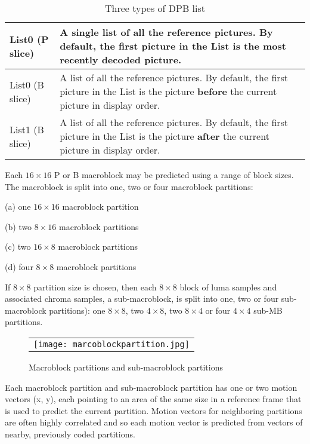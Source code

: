 \documentclass[../main.tex]{subfiles}
\begin{document}
\begin{table}[ht]
\label{tab:list}
\begin{center}       
\begin{tabular}{|l|l|} 
\hline
\rule[-1ex]{0pt}{3.5ex}  List0 (P slice) & A single list of all the reference pictures.  By default, the first picture in
the List is the most recently decoded picture.\\  %
\hline
\rule[-1ex]{0pt}{3.5ex}  List0 (B slice) & A list of all the reference pictures. By default, the first picture in the List
is the picture \textbf {before} the current picture in display order.   \\%
\hline
\rule[-1ex]{0pt}{3.5ex}  List1 (B slice) & A list of all the reference pictures. By default, the first picture in the List
is the picture \textbf {after} the current picture in display order.  \\%
\hline

\end{tabular}
\end{center}
\caption{Three types of DPB list} 
\end{table}

Each $16 \times 16$ P or B macroblock may be predicted using a range
of block sizes. The macroblock is split into one, two or four
macroblock partitions:

(a) one $16 \times 16$ macroblock partition 

(b) two $8 \times 16$ macroblock partitions

(c) two $16 \times 8$ macroblock partitions 

(d) four $8 \times 8$ macroblock partitions

If $8 \times 8$ partition size is chosen, then each $8 \times 8$ block of luma samples and associated chroma
samples, a sub-macroblock, is split into one, two or four sub-macroblock partitions): one
$8 \times 8$, two $4 \times 8$, two $8 \times 4$ or four $4 \times 4$ sub-MB partitions.

\begin{figure} [ht]
   \begin{center}
   \begin{tabular}{c} %
   \texttt{[image: marcoblockpartition.jpg]}
   \end{tabular}
   \end{center}
   \caption[example] 
   { \label{fig:example1} 
Macroblock partitions and sub-macroblock partitions}
   \end{figure}     %
   
Each macroblock partition and sub-macroblock partition has one or two motion vectors
(x, y), each pointing to an area of the same size in a reference frame that is used to predict the
current partition. Motion vectors for neighboring partitions are often highly
correlated and so each motion vector is predicted from vectors of nearby, previously coded
partitions. 
\end{document}
